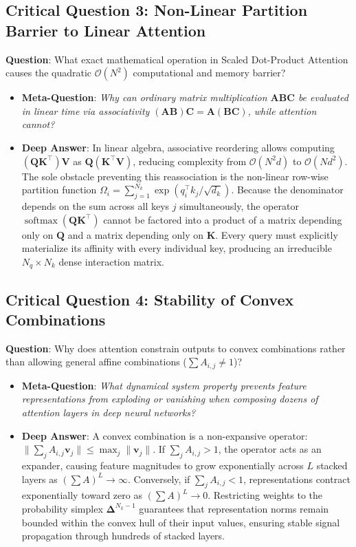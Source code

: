 \documentclass[11pt,a4paper]{article}
\theoremstyle{definition}
\begin{document}
\subsection{\textbf{Critical Question 3: Non-Linear Partition Barrier to Linear Attention}}
\textbf{Question}: What exact mathematical operation in Scaled Dot-Product Attention causes the quadratic $\mathcal{O}(N^2)$ computational and memory barrier?
\begin{itemize}
    \item \textbf{Meta-Question}: \emph{Why can ordinary matrix multiplication $\mathbf{A}\mathbf{B}\mathbf{C}$ be evaluated in linear time via associativity $(\mathbf{A}\mathbf{B})\mathbf{C} = \mathbf{A}(\mathbf{B}\mathbf{C})$, while attention cannot?}
    \item \textbf{Deep Answer}: In linear algebra, associative reordering allows computing $(\mathbf{Q}\mathbf{K}^\top)\mathbf{V}$ as $\mathbf{Q}(\mathbf{K}^\top \mathbf{V})$, reducing complexity from $\mathcal{O}(N^2 d)$ to $\mathcal{O}(N d^2)$. The sole obstacle preventing this reassociation is the non-linear row-wise partition function $\Omega_i = \sum_{j=1}^{N_k} \exp(q_i^\top k_j / \sqrt{d_k})$. Because the denominator depends on the sum across all keys $j$ simultaneously, the operator $\operatorname{softmax}(\mathbf{Q}\mathbf{K}^\top)$ cannot be factored into a product of a matrix depending only on $\mathbf{Q}$ and a matrix depending only on $\mathbf{K}$. Every query must explicitly materialize its affinity with every individual key, producing an irreducible $N_q \times N_k$ dense interaction matrix.
\end{itemize}

\subsection{\textbf{Critical Question 4: Stability of Convex Combinations}}
\textbf{Question}: Why does attention constrain outputs to convex combinations rather than allowing general affine combinations ($\sum A_{i, j} \ne 1$)?
\begin{itemize}
    \item \textbf{Meta-Question}: \emph{What dynamical system property prevents feature representations from exploding or vanishing when composing dozens of attention layers in deep neural networks?}
    \item \textbf{Deep Answer}: A convex combination is a non-expansive operator: $\|\sum_j A_{i, j} \mathbf{v}_j\| \le \max_j \|\mathbf{v}_j\|$. If $\sum_j A_{i, j} > 1$, the operator acts as an expander, causing feature magnitudes to grow exponentially across $L$ stacked layers as $(\sum A)^L \to \infty$. Conversely, if $\sum_j A_{i, j} < 1$, representations contract exponentially toward zero as $(\sum A)^L \to 0$. Restricting weights to the probability simplex $\boldsymbol{\Delta}^{N_k - 1}$ guarantees that representation norms remain bounded within the convex hull of their input values, ensuring stable signal propagation through hundreds of stacked layers.
\end{itemize}
\end{document}
